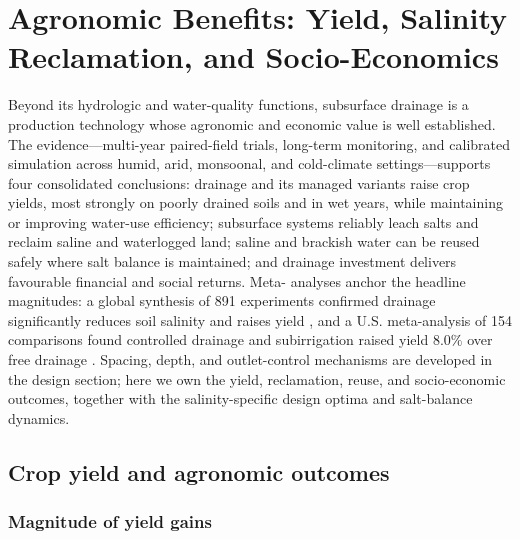 \section{Agronomic Benefits: Yield, Salinity Reclamation, and Socio-Economics}

Beyond its hydrologic and water-quality functions, subsurface drainage is a
production technology whose agronomic and economic value is well established.
The evidence---multi-year paired-field trials, long-term monitoring, and
calibrated simulation across humid, arid, monsoonal, and cold-climate
settings---supports four consolidated conclusions: drainage and its managed
variants raise crop yields, most strongly on poorly drained soils and in wet
years, while maintaining or improving water-use efficiency; subsurface systems
reliably leach salts and reclaim saline and waterlogged land; saline and
brackish water can be reused safely where salt balance is maintained; and
drainage investment delivers favourable financial and social returns. Meta-
analyses anchor the headline magnitudes: a global synthesis of 891 experiments
confirmed drainage significantly reduces soil salinity and raises yield
\parencite{Yang2025}, and a U.S. meta-analysis of 154 comparisons found
controlled drainage and subirrigation raised yield $8.0\%$ over free drainage
\parencite{Singh2022b}. Spacing, depth, and outlet-control mechanisms are
developed in the design section; here we own the yield, reclamation, reuse, and
socio-economic outcomes, together with the salinity-specific design optima and
salt-balance dynamics.

\subsection{Crop yield and agronomic outcomes}

\subsubsection{Magnitude of yield gains}

